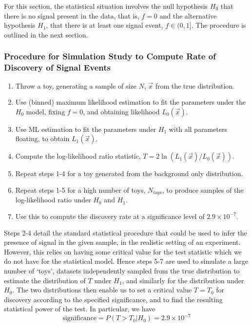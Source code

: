 \documentclass[12pt]{article}
\begin{document}
For this section, the statistical situation involves the null hypothesis $H_0$ that there is no signal present in the data, that is, $f=0$ and the alternative hypothesis $H_1$, that there is at least one signal event, $f\in(0,1]$.
The procedure is outlined in the next section.
\subsubsection*{Procedure for Simulation Study to Compute Rate of Discovery of Signal Events}
\begin{enumerate}
    \item Throw a toy, generating a sample of size $N$, $\vec{x}$ from the true distribution.
    \item Use (binned) maximum likelihood estimation to fit the parameters under the $H_0$ model, fixing $f=0$, and obtaining likelihood $L_0(\vec{x})$.
    \item Use ML estimation to fit the parameters under $H_1$ with all parameters floating, to obtain $L_1(\vec{x})$.
    \item Compute the log-likelihood ratio statistic, $T = 2\ln(L_1(\vec{x})/L_0(\vec{x}))$.
    \item Repeat steps 1-4 for a toy generated from the background only distribution.
    \item Repeat steps 1-5 for a high number of toys, $N_{toys}$, to produce samples of the log-likelihood ratio under $H_0$ and $H_1$.
    \item Use this to compute the discovery rate at a significance level of $2.9\times10^{-7}$.
\end{enumerate}
Steps 2-4 detail the standard statistical procedure that could be used to infer the presence of signal in the given sample, in the realistic setting of an experiment.
However, this relies on having some critical value for the test statistic which we do not have for the statistical model.
Hence steps 5-7 are used to simulate a large number of `toys', datasets independently sampled from the true distribution to estimate the distribution of $T$ under $H_1$, and similarly for the distribution under $H_0$.
The two distributions then enable us to set a critical value $T=T_0$ for discovery according to the specified significance, and to find the resulting statistical power of the test.
In particular, we have
\begin{equation}
\label{eq_significance}
    \text{significance} = P(T>T_0|H_0) = 2.9\times10^{-7}
\end{equation}
\end{document}
